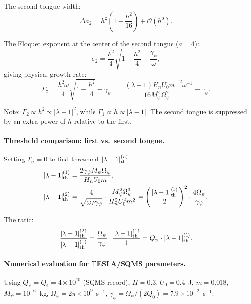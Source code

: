\documentclass[11pt,twocolumn]{article}
\newcommand{\lam}{\lambda}
\newcommand{\Opsi}{\Omega_\psi}
\newcommand{\gpsi}{\gamma_\psi}
\newcommand{\Mpsi}{M_\psi}
\newcommand{\order}[1]{\mathcal{O}(#1)}
\begin{document}
The second tongue width:
\begin{equation}
\Delta a_2 = h^2\left(1 - \frac{h^2}{16}\right) + \order{h^6}.
\label{eq:tongue2_width}
\end{equation}

The Floquet exponent at the center of the second tongue ($a = 4$):
\begin{equation}
\sigma_2 = \frac{h^2}{4}\sqrt{1 - \frac{h^2}{4}}
- \frac{\gpsi}{\omega},
\label{eq:sigma2}
\end{equation}
giving physical growth rate:
\begin{equation}
\boxed{
\Gamma_2 = \frac{h^2\omega}{4}\sqrt{1 - \frac{h^2}{4}} - \gpsi
= \frac{[(\lam-1)H_n U_0 m]^2\omega^{-1}}{16\Mpsi^2\Opsi^2} - \gpsi.
}
\label{eq:Gamma2}
\end{equation}

Note: $\Gamma_2 \propto h^2 \propto |\lam-1|^2$, while
$\Gamma_1 \propto h \propto |\lam-1|$. The second tongue is
suppressed by an extra power of $h$ relative to the first.

\paragraph{Threshold comparison: first vs.\ second tongue.}
Setting $\Gamma_n = 0$ to find threshold $|\lam-1|_{\rm th}^{(n)}$:
\begin{align}
|\lam-1|_{\rm th}^{(1)} &= \frac{2\gpsi\Mpsi\Opsi}{H_n U_0 m},
\label{eq:thresh1}\\
|\lam-1|_{\rm th}^{(2)} &=
\frac{4}{\sqrt{\omega/\gpsi}}\cdot\frac{\Mpsi^2\Opsi^3}
{H_n^2 U_0^2 m^2}
= \left(\frac{|\lam-1|_{\rm th}^{(1)}}{2}\right)^2
\cdot\frac{4\Opsi}{\gpsi}.
\label{eq:thresh2}
\end{align}

The ratio:
\begin{equation}
\frac{|\lam-1|_{\rm th}^{(2)}}{|\lam-1|_{\rm th}^{(1)}}
= \frac{\Opsi}{\gpsi}\cdot\frac{|\lam-1|_{\rm th}^{(1)}}{1}
= Q_\psi \cdot |\lam-1|_{\rm th}^{(1)}.
\label{eq:thresh_ratio}
\end{equation}

\paragraph{Numerical evaluation for TESLA/SQMS parameters.}
Using $Q_\psi = Q_0 = 4\times10^{10}$ (SQMS record), $H = 0.3$,
$U_0 = 0.4$~J, $m = 0.018$, $\Mpsi = 10^{-6}$~kg,
$\Opsi = 2\pi\times10^9$~s$^{-1}$, $\gpsi = \Opsi/(2Q_0)
= 7.9\times10^{-2}$~s$^{-1}$:
\end{document}
